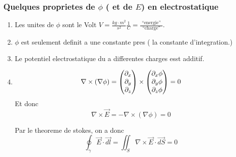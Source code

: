 \documentclass[../main.tex]{subfiles}
\begin{document}
\subsubsection{Quelques proprietes de $\phi$ ( et de $E$) en electrostatique}
\begin{enumerate}
\item Les unites de $\phi$ sont le Volt $V = \frac{kg \cdot m^{2}}{ s ^{2}} \frac{1}{C}= \frac{ \text{ ``energie''  } }{ \text{ ``charge''  } }$.\\
\item $\phi$ est seulement definit a une constante pres ( la constante d'integration.)
\item Le potentiel electrostatique du a differentes charges esst additif.
\item 
	\[ 
		\nabla \times ( \nabla \phi) = 
		\begin{pmatrix}
		\partial_x \\ \partial_y \\ \partial_z
		\end{pmatrix}
		\times
		\begin{pmatrix}
		\partial_x \phi \\ \partial_y\phi \\ \partial_z \phi
		\end{pmatrix}
		=0
	\]
	Et donc
	\[ 
		\nabla \times \vec{E} = - \nabla \times ( \nabla \phi)  = 0
	\]
	
	Par le theoreme de stokes, on a donc
	\[ 
	\oint_{\gamma} \vec{E} \cdot \vec{dl} = \iint_S \nabla\times \vec{E} \cdot \vec{dS} =0
	\]
	
\end{enumerate}



		
\end{document}
